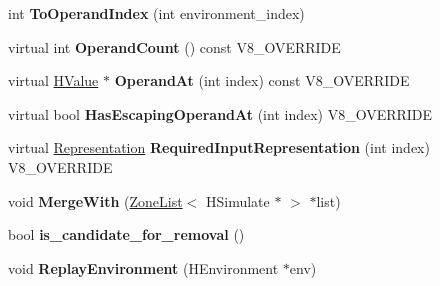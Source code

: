 \begin{DoxyCompactItemize}
\item 
\hypertarget{classv8_1_1internal_1_1_v8___f_i_n_a_l_a1a8887687bff7c5f52a44c90177fb476}{}int {\bfseries To\+Operand\+Index} (int environment\+\_\+index)\label{classv8_1_1internal_1_1_v8___f_i_n_a_l_a1a8887687bff7c5f52a44c90177fb476}

\item 
\hypertarget{classv8_1_1internal_1_1_v8___f_i_n_a_l_a74577ee66b859bf4d6d38144bd3b3d4c}{}virtual int {\bfseries Operand\+Count} () const V8\+\_\+\+O\+V\+E\+R\+R\+I\+D\+E\label{classv8_1_1internal_1_1_v8___f_i_n_a_l_a74577ee66b859bf4d6d38144bd3b3d4c}

\item 
\hypertarget{classv8_1_1internal_1_1_v8___f_i_n_a_l_a82dac9e772c6aaf9b66c35530d0151a3}{}virtual \hyperlink{classv8_1_1internal_1_1_h_value}{H\+Value} $\ast$ {\bfseries Operand\+At} (int index) const V8\+\_\+\+O\+V\+E\+R\+R\+I\+D\+E\label{classv8_1_1internal_1_1_v8___f_i_n_a_l_a82dac9e772c6aaf9b66c35530d0151a3}

\item 
\hypertarget{classv8_1_1internal_1_1_v8___f_i_n_a_l_ae559b1a39de93c2925ab5815da490738}{}virtual bool {\bfseries Has\+Escaping\+Operand\+At} (int index) V8\+\_\+\+O\+V\+E\+R\+R\+I\+D\+E\label{classv8_1_1internal_1_1_v8___f_i_n_a_l_ae559b1a39de93c2925ab5815da490738}

\item 
\hypertarget{classv8_1_1internal_1_1_v8___f_i_n_a_l_a6c6d1f37f40b113d8f4062f1ffff7215}{}virtual \hyperlink{classv8_1_1internal_1_1_representation}{Representation} {\bfseries Required\+Input\+Representation} (int index) V8\+\_\+\+O\+V\+E\+R\+R\+I\+D\+E\label{classv8_1_1internal_1_1_v8___f_i_n_a_l_a6c6d1f37f40b113d8f4062f1ffff7215}

\item 
\hypertarget{classv8_1_1internal_1_1_v8___f_i_n_a_l_a2b5d4eac0514c3334ec49bc6cc933362}{}void {\bfseries Merge\+With} (\hyperlink{classv8_1_1internal_1_1_zone_list}{Zone\+List}$<$ H\+Simulate $\ast$ $>$ $\ast$list)\label{classv8_1_1internal_1_1_v8___f_i_n_a_l_a2b5d4eac0514c3334ec49bc6cc933362}

\item 
\hypertarget{classv8_1_1internal_1_1_v8___f_i_n_a_l_a4ea52a5da509e435491f7686e159e2ec}{}bool {\bfseries is\+\_\+candidate\+\_\+for\+\_\+removal} ()\label{classv8_1_1internal_1_1_v8___f_i_n_a_l_a4ea52a5da509e435491f7686e159e2ec}

\item 
\hypertarget{classv8_1_1internal_1_1_v8___f_i_n_a_l_a94f0e462341a57972a6d9275eb3b54c4}{}void {\bfseries Replay\+Environment} (H\+Environment $\ast$env)\label{classv8_1_1internal_1_1_v8___f_i_n_a_l_a94f0e462341a57972a6d9275eb3b54c4}


\end{DoxyCompactItemize}
